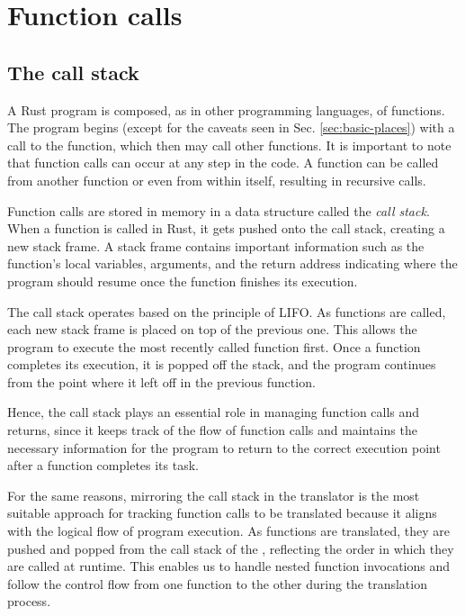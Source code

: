 \section{Function calls}
\label{sec:function-calls}

\subsection{The call stack}

A Rust program is composed, as in other programming languages, of functions.
The program begins (except for the caveats seen in Sec. \ref{sec:basic-places})
with a call to the  function, which then may call other functions.
It is important to note that function calls can occur at any step in the code.
A function can be called from another function or even from within itself, resulting in recursive calls.

Function calls are stored in memory in a data structure called the \emph{call stack}.
When a function is called in Rust, it gets pushed onto the call stack, creating a new stack frame.
A stack frame contains important information such as the function's local variables, arguments,
and the return address indicating where the program should resume once the function finishes its execution.

The call stack operates based on the principle of \acrfull{LIFO}.
As functions are called, each new stack frame is placed on top of the previous one.
This allows the program to execute the most recently called function first.
Once a function completes its execution, it is popped off the stack,
and the program continues from the point where it left off in the previous function.

Hence, the call stack plays an essential role in managing function calls and returns,
since it keeps track of the flow of function calls and maintains the necessary information
for the program to return to the correct execution point after a function completes its task.

For the same reasons, mirroring the call stack in the translator
is the most suitable approach for tracking function calls to be translated
because it aligns with the logical flow of program execution.
As functions are translated, they are pushed and popped
from the call stack of the ,
reflecting the order in which they are called at runtime.
This enables us to handle nested function invocations and
follow the control flow from one function to the other during the translation process.

